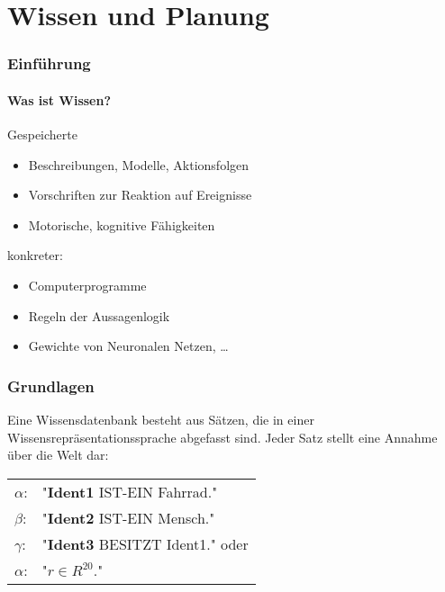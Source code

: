 
\chapter{Wissen und Planung}

\subsection{Einführung}

\subsubsection*{Was ist Wissen?}
Gespeicherte
\begin{itemize}
\item Beschreibungen, Modelle, Aktionsfolgen
\item Vorschriften zur Reaktion auf Ereignisse
\item Motorische, kognitive Fähigkeiten
\end{itemize}
konkreter:
\begin{itemize}
\item Computerprogramme
\item Regeln der Aussagenlogik
\item Gewichte von Neuronalen Netzen, \dots
\end{itemize}

\subsection{Grundlagen}


Eine Wissensdatenbank besteht aus Sätzen, die in einer Wissensrepräsentationssprache abgefasst sind. Jeder Satz stellt eine Annahme über die Welt dar:
\begin{center}
\begin{tabular}{ll}
$\alpha$: & "{}\textbf{Ident1} IST-EIN Fahrrad."{} \\ $\beta$: & "{}\textbf{Ident2} IST-EIN Mensch."{} \\ $\gamma$: & "{}\textbf{Ident3} BESITZT Ident1."{} oder \\ $\alpha$: & "{}$r \in R^{20}$."{}
\end{tabular}
\end{center}


